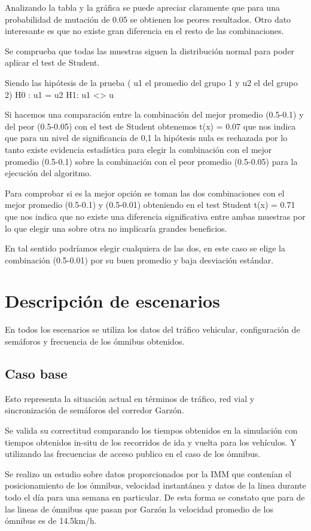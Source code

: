 Analizando la tabla y la gráfica se puede apreciar claramente que para una probabilidad de mutación de 0.05 se obtienen los peores resultados. Otro dato interesante es que no existe gran diferencia en el resto de las combinaciones.

Se comprueba que todas las muestras siguen la distribución normal  para poder aplicar el test de Student.

Siendo las hipótesis de la prueba ( u1 el promedio del 
grupo 1 y u2 el del grupo 2)
H0 : u1 = u2  
H1: u1 <> u

Si hacemos una comparación entre la combinación del mejor promedio (0.5-0.1) y del peor (0.5-0.05) con el test de Student obtenemos t(x) = 0.07 que nos indica que para un nivel de significancia de  0,1 la hipótesis nula es rechazada por lo tanto existe evidencia estadística para elegir la combinación con el mejor promedio (0.5-0.1) sobre la combinación con el peor promedio (0.5-0.05) para la ejecución del algoritmo.

Para comprobar si es la mejor opción  se toman las dos combinaciones con el mejor promedio (0.5-0.1) y (0.5-0.01) obteniendo en el test Student t(x) = 0.71 que nos indica que no existe una diferencia significativa entre ambas muestras por lo que elegir una sobre otra no implicaría grandes beneficios.

En tal sentido podríamos elegir cualquiera de las dos, en este caso se elige  la combinación (0.5-0.01) por su buen promedio y baja desviación estándar.


\section{Descripción de escenarios}
En todos los escenarios se utiliza los datos del tráfico vehicular, configuración de semáforos y frecuencia de los ómnibus obtenidos. 

\subsection{Caso base}
Esto representa la situación actual en términos de tráfico, red vial y sincronización de semáforos del corredor Garzón. 

Se valida su correctitud comparando los tiempos obtenidos en la simulación con tiempos obtenidos in-situ de los recorridos de ida y vuelta para los vehículos. Y utilizando las frecuencias de acceso publico en el caso de los ómnibus.

Se realizo un estudio sobre datos proporcionados por la IMM que contenían el posicionamiento de los ómnibus, velocidad instantánea y datos de la linea durante todo el día para una semana en particular. De esta forma se constato que para de las lineas de ómnibus que pasan por Garzón la  velocidad promedio de los ómnibus es de 14.5km/h.

